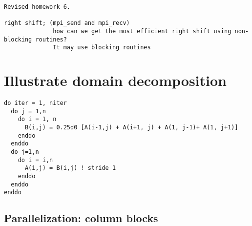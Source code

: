 \documentclass[10pt]{article}
\begin{document}
\begin{verbatim}
Revised homework 6.

right shift; (mpi_send and mpi_recv)
              how can we get the most efficient right shift using non-blocking routines?
              It may use blocking routines
\end{verbatim}

\section*{Illustrate domain decomposition}
\begin{verbatim}
do iter = 1, niter
  do j = 1,n
    do i = 1, n
      B(i,j) = 0.25d0 [A(i-1,j) + A(i+1, j) + A(1, j-1)+ A(1, j+1)]
    enddo
  enddo
  do j=1,n
    do i = i,n
      A(i,j) = B(i,j) ! stride 1
    enddo
  enddo
enddo
\end{verbatim}

\subsection*{Parallelization: column blocks}
\end{document}
